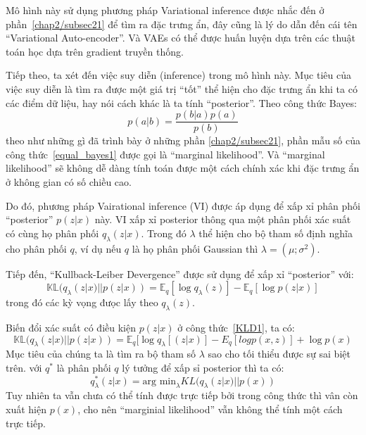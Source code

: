         Mô hình này sử dụng phương pháp Variational inference được nhắc đến ở phần~\ref{chap2/subsec21} để tìm ra đặc trưng ẩn, đây cũng là lý do dẫn đến cái tên ``Variational Auto-encoder''. Và VAEs có thể được huấn luyện dựa trên các thuật toán  học dựa trên gradient truyền thống.
        
        
        Tiếp theo, ta xét đến việc suy diễn (inference) trong mô hình này. 
        Mục tiêu của việc suy diễn là tìm ra được một giá trị ``tốt'' thể hiện cho đặc trưng ẩn khi ta có các điểm dữ liệu, hay nói cách khác là ta tính ``posterior''.
        Theo công thức Bayes:
        \begin{equation}
        \label{equal_bayes1}
            p(a|b) = \frac{p(b|a)p(a)}{p(b)}
        \end{equation}
        theo như những gì đã trình bày ở những phần \ref{chap2/subsec21}, phần mẫu số 
        của công thức~\ref{equal_bayes1} được gọi là ``marginal likelihood''. 
        Và ``marginal likelihood'' sẽ không dễ dàng tính toán được một cách chính xác khi đặc trưng ẩn ở không gian có số chiều cao. 

        Do đó, phương pháp Vairational inference (VI) được áp dụng để xấp xỉ phân phối ``posterior'' $p(z|x)$ này.
        VI xấp xỉ posterior thông qua một phân phối xác suất có cùng họ phân phối $q_\lambda(z|x)$.
        Trong đó $\lambda$ thể hiện cho bộ tham số định nghĩa cho phân phối $q$, ví dụ nếu $q$ là  họ phân phối Gaussian thì $\lambda = (\mu;\sigma^2)$.
        
        Tiếp đến, ``Kullback-Leiber Devergence'' được sử dụng để xấp xỉ ``posterior'' 
        với:
        \begin{equation}
        \label{KLD1}
            \mathbb{KL}(q_\lambda(z|x) || p (z|x)) = \mathbb{E}_q[\log q_\lambda(z)] - \mathbb{E}_q[\log p(z|x)]
        \end{equation}
        trong đó các kỳ vọng đưọc lấy theo $q_\lambda(z)$.
        
        Biến đổi xác suất có điều kiện $p(z|x)$ ở công thức~\ref{KLD1}, ta có:
        \begin{equation}
        \label{KLD2}
            \mathbb{KL}(q_\lambda(z|x) || p (z|x)) =   \mathbb{E}_q[\log q_\lambda[(z|x)] - E_q[log p(x,z)] + \log p(x)
        \end{equation}
        Mục tiêu của chúng ta là tìm ra bộ tham số $\lambda$  sao cho tối thiểu được sự sai biệt trên. với $q^*$ là phân phối $q$ lý tưởng để xấp sỉ posterior thì ta có:
        \begin{equation}
        \label{equal_qlambda}
            q^*_\lambda(z|x) = \text{arg min}_\lambda KL(q_\lambda(z|x)|| p(x))
        \end{equation}        
        Tuy nhiên ta vẫn chưa có thể tính được trực tiếp bởi trong công thức thì vân còn xuất hiện $p(x)$, cho nên ``marginial likelihood'' vẫn không thể tính một cách trực tiếp.

